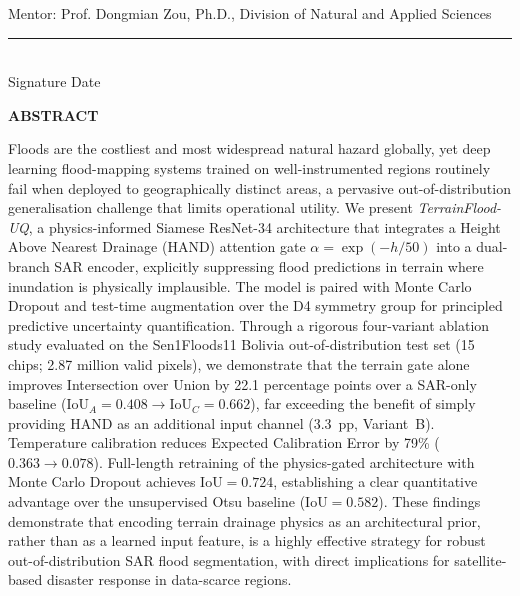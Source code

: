 \documentclass[12pt,oneside]{report}
\newcommand{\IoU}{\mathrm{IoU}}
\begin{document}
\noindent Mentor: Prof. Dongmian Zou, Ph.D., Division of Natural and Applied Sciences

\vspace{3em}
\noindent\rule{6cm}{0.4pt}\\
Signature \hspace{4cm} Date

\newpage
\tableofcontents

\newpage
\listoffigures

\newpage
\listoftables

\newpage
{}
{}
\begin{center}
  {\large\bfseries ABSTRACT}
\end{center}
\vspace{0.8em}

Floods are the costliest and most widespread natural hazard globally, yet
deep learning flood-mapping systems trained on well-instrumented regions
routinely fail when deployed to geographically distinct areas, a pervasive
out-of-distribution generalisation challenge that limits operational utility.
We present \textit{TerrainFlood-UQ}, a physics-informed Siamese ResNet-34
architecture that integrates a Height Above Nearest Drainage (HAND)
attention gate $\alpha = \exp(-h/50)$ into a dual-branch SAR encoder,
explicitly suppressing flood predictions in terrain where inundation is
physically implausible.
The model is paired with Monte Carlo Dropout and test-time augmentation over
the D4 symmetry group for principled predictive uncertainty quantification.
Through a rigorous four-variant ablation study evaluated on the Sen1Floods11
Bolivia out-of-distribution test set (15 chips; 2.87 million valid pixels),
we demonstrate that the terrain gate alone improves Intersection over Union
by 22.1 percentage points over a SAR-only baseline ($\IoU_A = 0.408
\to \IoU_C = 0.662$), far exceeding the benefit of simply providing HAND as
an additional input channel (3.3~pp, Variant~B).
Temperature calibration reduces Expected Calibration Error by 79\%
($0.363 \to 0.078$).
Full-length retraining of the physics-gated architecture with Monte Carlo
Dropout achieves $\IoU = 0.724$, establishing a clear quantitative advantage
over the unsupervised Otsu baseline ($\IoU = 0.582$).
These findings demonstrate that encoding terrain drainage physics as an
architectural prior, rather than as a learned input feature, is a highly
effective strategy for robust out-of-distribution SAR flood segmentation,
with direct implications for satellite-based disaster response in data-scarce
regions.
\end{document}
